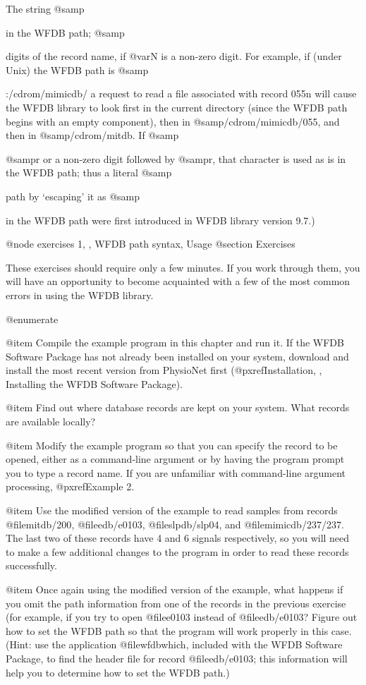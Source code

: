 {The string @samp{%
in the WFDB path;  @samp{%
digits of the record name, if @var{N} is a non-zero digit.  For example,
if (under Unix) the WFDB path is @samp{:/cdrom/mimicdb/%
a request to read a file associated with record 055n will cause the WFDB
library to look first in the current directory (since the WFDB path begins
with an empty component), then in @samp{/cdrom/mimicdb/055}, and then in
@samp{/cdrom/mitdb}.  If @samp{%
@samp{r} or a non-zero digit followed by @samp{r}, that character is used
as is in the WFDB path;  thus a literal @samp{%
path by `escaping' it as @samp{%
in the WFDB path were first introduced in WFDB library version 9.7.)

@node     exercises 1, , WFDB path syntax, Usage
@section Exercises

These exercises should require only a few minutes.  If you work through
them, you will have an opportunity to become acquainted with a few of
the most common errors in using the WFDB library.

@enumerate

@item
Compile the example program in this chapter and run it.  If the WFDB
Software Package has not already been installed on your system,
download and install the most recent version from PhysioNet first
(@pxref{Installation, , Installing the WFDB Software Package}).

@item
Find out where database records are kept on your system.  What records
are available locally?

@item
Modify the example program so that you can specify the record to be
opened, either as a command-line argument or by having the program prompt
you to type a record name.  If you are unfamiliar with command-line
argument processing, @pxref{Example 2}.

@item
Use the modified version of the example to read samples from records
@file{mitdb/200}, @file{edb/e0103}, @file{slpdb/slp04}, and
@file{mimicdb/237/237}.  The last two of these records have 4 and 6 signals
respectively, so you will need to make a few additional changes to the program
in order to read these records successfully.

@item
Once again using the modified version of the example, what happens if
you omit the path information from one of the records in the previous
exercise (for example, if you try to open @file{e0103} instead of
@file{edb/e0103}?  Figure out how to set the WFDB path so that the
program will work properly in this case.  (Hint: use the application
@file{wfdbwhich}, included with the WFDB Software Package, to find the
header file for record @file{edb/e0103}; this information will help
you to determine how to set the WFDB path.)

}}}}}}}
